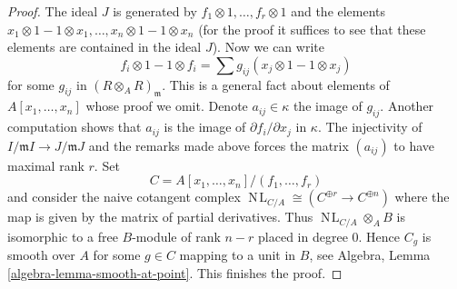 \documentclass{stacks-project}
\theoremstyle{plain}
\theoremstyle{definition}
\theoremstyle{remark}
\numberwithin{equation}{subsection}
\def\NL{\mathop{N\!L}\nolimits}
\begin{document}
\begin{proof}
\medskip\noindent
The ideal $J$ is generated by $f_1 \otimes 1, \ldots, f_r \otimes 1$
and the elements $x_1 \otimes 1 - 1 \otimes x_1, \ldots,
x_n \otimes 1 - 1 \otimes x_n$ (for the proof it suffices to
see that these elements are contained in the ideal $J$).
Now we can write
$$
f_i \otimes 1 - 1 \otimes f_i =
\sum g_{ij} (x_j \otimes 1 - 1 \otimes x_j)
$$
for some $g_{ij}$ in $(R \otimes_A R)_\mathfrak m$. This is a general
fact about elements of $A[x_1, \ldots, x_n]$ whose proof we omit.
Denote $a_{ij} \in \kappa$ the image of $g_{ij}$. Another computation
shows that $a_{ij}$ is the image of $\partial f_i / \partial x_j$ in $\kappa$.
The injectivity of $I/\mathfrak m I \to J/\mathfrak m J$ and the remarks
made above forces the matrix $(a_{ij})$ to have maximal rank $r$.
Set
$$
C = A[x_1, \ldots, x_n]/(f_1, \ldots, f_r)
$$
and consider the naive cotangent complex
$\NL_{C/A} \cong (C^{\oplus r} \to C^{\oplus n})$
where the map is given by the matrix of partial derivatives.
Thus $\NL_{C/A} \otimes_A B$
is isomorphic to a free $B$-module of rank $n - r$ placed in degree $0$.
Hence $C_g$ is smooth over $A$ for some $g \in C$ mapping to a unit
in $B$, see Algebra, Lemma \ref{algebra-lemma-smooth-at-point}.
This finishes the proof.
\end{proof}
\end{document}
